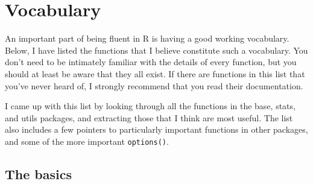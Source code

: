 \hypertarget{vocabulary}{%
\chapter{Vocabulary}\label{vocabulary}}

An important part of being fluent in R is having a good working
vocabulary. Below, I have listed the functions that I believe constitute
such a vocabulary. You don't need to be intimately familiar with the
details of every function, but you should at least be aware that they
all exist. If there are functions in this list that you've never heard
of, I strongly recommend that you read their documentation.

I came up with this list by looking through all the functions in the
base, stats, and utils packages, and extracting those that I think are
most useful. The list also includes a few pointers to particularly
important functions in other packages, and some of the more important
\texttt{options()}.

\hypertarget{the-basics}{%
\section{The basics}\label{the-basics}}

